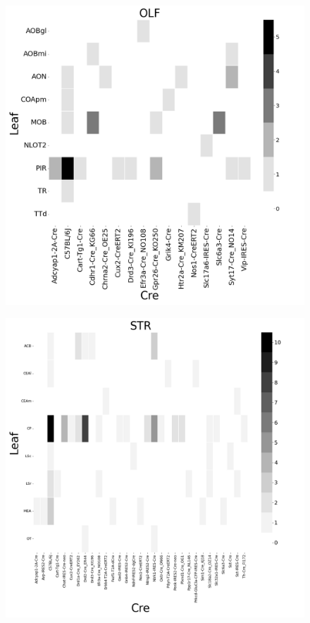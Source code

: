 \begin{figure}[H]
    \centering
    \includegraphics[width = 7in]{figs/OLF centroid density.png} 
    \label{fig:my_label}
\end{figure}
\newpage

\begin{figure}[H]
    \centering
    \includegraphics[width = 7in]{figs/STR centroid density.png} 
    \label{fig:my_label}
\end{figure}
\newpage

